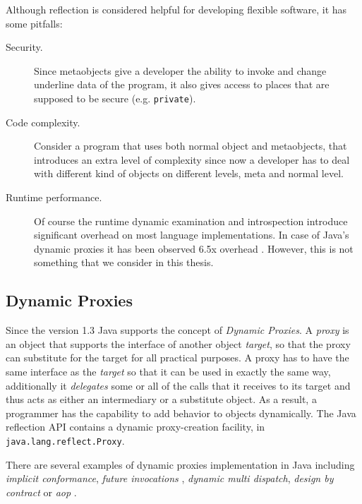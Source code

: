Although reflection is considered helpful for developing flexible software, it has some pitfalls:

\begin{description}
	
	\item[Security.] Since metaobjects give a developer the ability to invoke and change underline data of the program, it also gives access to places that are supposed to be secure (e.g. \texttt{private}).

	\item[Code complexity.] Consider a program that uses both normal object and metaobjects, that introduces an extra level of complexity since now a developer has to deal with different kind of objects on different levels, meta and normal level.

	\item[Runtime performance.] Of course the runtime dynamic examination and introspection introduce significant overhead on most language implementations. 
	In case of Java's dynamic proxies it has been observed 6.5x overhead \cite{marr2015zero}. 
	However, this is not something that we consider in this thesis.

\end{description}

\subsection{Dynamic Proxies}\label{Dynamic Proxies}
Since the version 1.3 Java supports the concept of \textit{Dynamic Proxies}.
A \textit{proxy} is an object that supports the interface of another object \textit{target}, so that the proxy can substitute for the target for all practical purposes\cite{forman2004java}.
A proxy has to have the same interface as the \textit{target} so that it can be used in exactly the same way, additionally
it \textit{delegates} some or all of the calls that it receives to its target and thus acts as either an intermediary or a substitute object.
As a result, a programmer has the capability to add behavior to objects dynamically. 
The Java reflection API contains a dynamic proxy-creation facility, in \texttt{java.lang.reflect.Proxy}.

There are several examples of dynamic proxies implementation in Java including \textit{implicit conformance}, \textit{future invocations} \cite{pratikakis2004transparent}, \textit{dynamic multi dispatch}, \textit{design by contract} or \textit{\ac{aop}} \cite{eugster2006uniform}.

